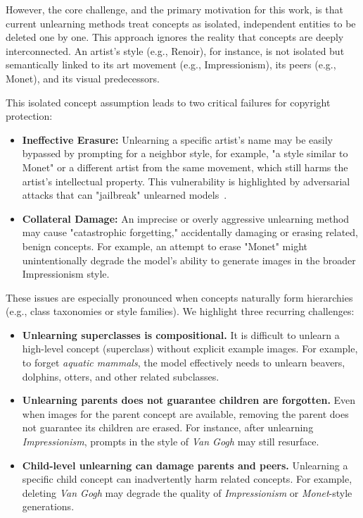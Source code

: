 However, the core challenge, and the primary motivation for this work, is that current unlearning methods treat concepts as isolated, independent entities to be deleted one by one. This approach ignores the reality that concepts are deeply interconnected. An artist's style (e.g., Renoir), for instance, is not isolated but semantically linked to its art movement (e.g., Impressionism), its peers (e.g., Monet), and its visual predecessors.

This isolated concept assumption leads to two critical failures for copyright protection:
\begin{itemize}
    \item \textbf{Ineffective Erasure:} Unlearning a specific artist's name may be easily bypassed by prompting for a neighbor style, for example, "a style similar to Monet" or a different artist from the same movement, which still harms the artist's intellectual property. This vulnerability is highlighted by adversarial attacks that can "jailbreak" unlearned models~\cite{zhang2024generate}.
    \item \textbf{Collateral Damage:} An imprecise or overly aggressive unlearning method may cause "catastrophic forgetting," accidentally damaging or erasing related, benign concepts. For example, an attempt to erase "Monet" might unintentionally degrade the model's ability to generate images in the broader Impressionism style.
\end{itemize}

These issues are especially pronounced when concepts naturally form hierarchies (e.g., class taxonomies or style families). We highlight three recurring challenges:

\begin{itemize}
    \item \textbf{Unlearning superclasses is compositional.} It is difficult to unlearn a high-level concept (superclass) without explicit example images. For example, to forget \textit{aquatic mammals}, the model effectively needs to unlearn beavers, dolphins, otters, and other related subclasses.
    \item \textbf{Unlearning parents does not guarantee children are forgotten.} Even when images for the parent concept are available, removing the parent does not guarantee its children are erased. For instance, after unlearning \textit{Impressionism}, prompts in the style of \textit{Van Gogh} may still resurface.
    \item \textbf{Child-level unlearning can damage parents and peers.} Unlearning a specific child concept can inadvertently harm related concepts. For example, deleting \textit{Van Gogh} may degrade the quality of \textit{Impressionism} or \textit{Monet}-style generations.
\end{itemize}

